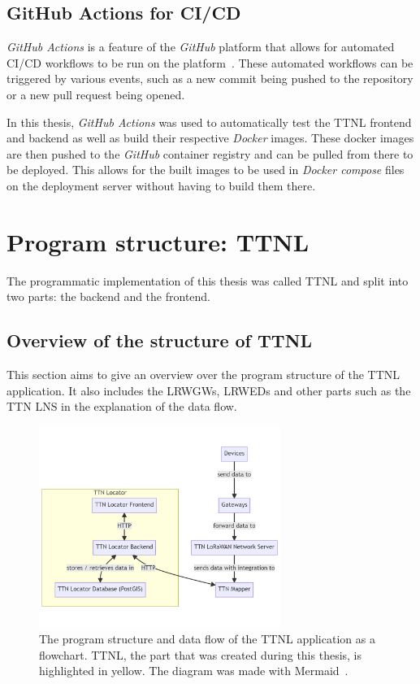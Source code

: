 \subsection{GitHub Actions for \acl{CI/CD}}

\emph{GitHub Actions} is a feature of the \emph{GitHub} platform that allows for automated \ac{CI/CD} workflows to be run on the platform~\cite{github_inc_features_2023}.
These automated workflows can be triggered by various events, such as a new commit being pushed to the repository or a new pull request being opened.

In this thesis, \emph{GitHub Actions} was used to automatically test the \ac{TTNL} frontend and backend as well as build their respective \emph{Docker} images.
These docker images are then pushed to the \emph{GitHub} container registry and can be pulled from there to be deployed.
This allows for the built images to be used in \emph{Docker compose} files on the deployment server without having to build them there.

\section{Program structure: \acl{TTNL}}\label{section:ttnl}

The programmatic implementation of this thesis was called \acf{TTNL} and split into two parts: the backend and the frontend.

\subsection{Overview of the structure of \acl{TTNL}}

This section aims to give an overview over the program structure of the \ac{TTNL} application.
It also includes the \aclp{LRWGW}, \aclp{LRWED} and other parts such as the \ac{TTN} \ac{LNS} in the explanation of the data flow.

\begin{figure}[htbp]
    \centering
    \includegraphics[width=0.7\textwidth]{pictures/ttn-locator/program_structure.png}
    \caption{
        The program structure and data flow of the \ac{TTNL} application as a flowchart.
        \ac{TTNL}, the part that was created during this thesis, is highlighted in yellow.
        The diagram was made with Mermaid~\cite{mermaid_mermaid_2023}.
    }\label{pic:program-structure}
\end{figure}

